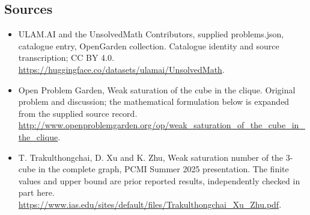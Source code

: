 \documentclass[11pt,a4paper]{article}
\begin{document}
\subsection{Sources}
\begin{itemize}
\item[S1] ULAM.AI and the UnsolvedMath Contributors, supplied problems.json, catalogue entry, OpenGarden collection. Catalogue identity and source transcription; CC BY 4.0.
\url{https://huggingface.co/datasets/ulamai/UnsolvedMath}.
\item[S2] Open Problem Garden, Weak saturation of the cube in the clique. Original problem and discussion; the mathematical formulation below is expanded from the supplied source record.
\url{http://www.openproblemgarden.org/op/weak_saturation_of_the_cube_in_the_clique}.
\item[S3] T. Trakulthongchai, D. Xu and K. Zhu, Weak saturation number of the 3-cube in the complete graph, PCMI Summer 2025 presentation. The finite values and upper bound are prior reported results, independently checked in part here.
\url{https://www.ias.edu/sites/default/files/Trakulthongchai_Xu_Zhu.pdf}.
\end{itemize}
\end{document}
